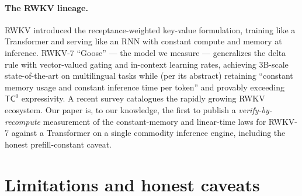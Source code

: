 \documentclass[11pt,a4paper]{article}
\begin{document}
\paragraph{The RWKV lineage.}
RWKV \citep{peng2023rwkv} introduced the receptance-weighted key-value
formulation, training like a Transformer and serving like an RNN with constant
compute and memory at inference. RWKV-7 ``Goose'' \citep{peng2025rwkv7} ---
the model we measure --- generalizes the delta rule with vector-valued gating
and in-context learning rates, achieving 3B-scale state-of-the-art on
multilingual tasks while (per its abstract) retaining ``constant memory usage
and constant inference time per token'' and provably exceeding \(\mathsf{TC}^0\)
expressivity. A recent survey \citep{li2024rwkvsurvey} catalogues the rapidly
growing RWKV ecosystem. Our paper is, to our knowledge, the first to publish a
\emph{verify-by-recompute} measurement of the constant-memory and linear-time
laws for RWKV-7 against a Transformer on a single commodity inference engine,
including the honest prefill-constant caveat.

\section{Limitations and honest caveats}
\label{sec:limits}
\end{document}
